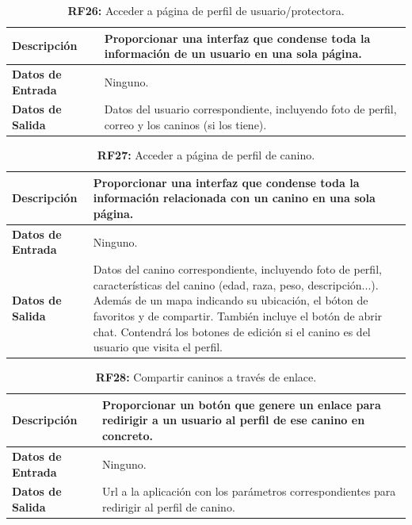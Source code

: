 \documentclass[a4paper, 12pt]{article}
\begin{document}
\begin{table}[H]
\captionsetup{list=no}%
\captionsetup{justification=raggedright,singlelinecheck=false}
\captionsetup{labelformat=empty}
\caption{\textbf{RF26:} Acceder a página de perfil de usuario/protectora.}
\label{tab:RF26}
	\begin{tabular}{|m{5cm}|m{10cm}|}
	\hline
	\textbf{Descripción} & Proporcionar una interfaz que condense toda la información de un usuario en una sola página. \\ 
	\hline
	\textbf{Datos de Entrada} & Ninguno. \\ 
	\hline
	\textbf{Datos de Salida} & Datos del usuario correspondiente, incluyendo foto de perfil, correo y los caninos (si los tiene). \\ 
	\hline
\end{tabular}
\end{table}

\begin{table}[H]
\captionsetup{list=no}%
\captionsetup{justification=raggedright,singlelinecheck=false}
\captionsetup{labelformat=empty}
\caption{\textbf{RF27:} Acceder a página de perfil de canino.}
\label{tab:RF27}
	\begin{tabular}{|m{5cm}|m{10cm}|}
	\hline
	\textbf{Descripción} & Proporcionar una interfaz que condense toda la información relacionada con un canino en una sola página. \\ 
	\hline
	\textbf{Datos de Entrada} & Ninguno. \\ 
	\hline
	\textbf{Datos de Salida} & Datos del canino correspondiente, incluyendo foto de perfil, características del canino (edad, raza, peso, descripción...). Además de un mapa indicando su ubicación, el bóton de favoritos y de compartir. También incluye el botón de abrir chat. Contendrá los botones de edición si el canino es del usuario que visita el perfil. \\ 
	\hline
\end{tabular}
\end{table}

\begin{table}[H]
\captionsetup{list=no}%
\captionsetup{justification=raggedright,singlelinecheck=false}
\captionsetup{labelformat=empty}
\caption{\textbf{RF28:} Compartir caninos a través de enlace.}
\label{tab:RF28}
	\begin{tabular}{|m{5cm}|m{10cm}|}
	\hline
	\textbf{Descripción} & Proporcionar un botón que genere un enlace para redirigir a un usuario al perfil de ese canino en concreto. \\ 
	\hline
	\textbf{Datos de Entrada} & Ninguno. \\ 
	\hline
	\textbf{Datos de Salida} & Url a la aplicación con los parámetros correspondientes para redirigir al perfil de canino. \\ 
	\hline
\end{tabular}
\end{table}
\end{document}
